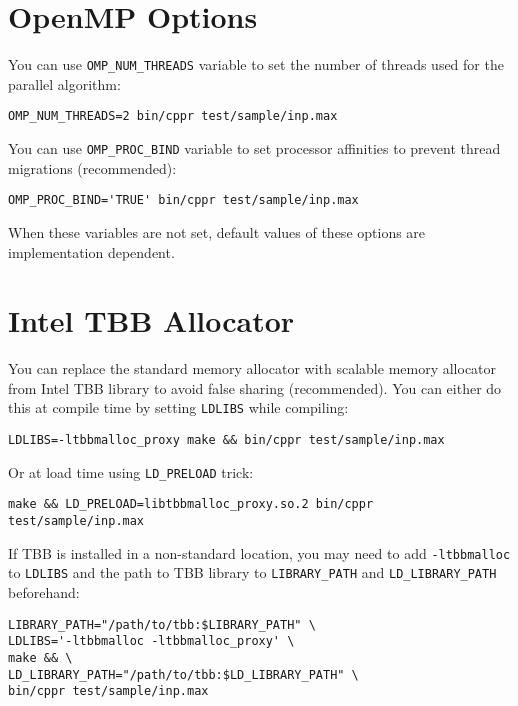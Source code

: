 \documentclass{article}
\begin{document}
\section{OpenMP Options}

You can use \texttt{OMP\_NUM\_THREADS} variable to set the number of threads used for
the parallel algorithm:

\begin{verbatim}
OMP_NUM_THREADS=2 bin/cppr test/sample/inp.max
\end{verbatim}

You can use \texttt{OMP\_PROC\_BIND} variable to set processor affinities to prevent
thread migrations (recommended):

\begin{verbatim}
OMP_PROC_BIND='TRUE' bin/cppr test/sample/inp.max
\end{verbatim}

When these variables are not set, default values of these options are
implementation dependent.

\section{Intel TBB Allocator}

You can replace the standard memory allocator with scalable memory allocator
from Intel TBB library to avoid false sharing (recommended). You can either
do this at compile time by setting \texttt{LDLIBS} while compiling:

\begin{verbatim}
LDLIBS=-ltbbmalloc_proxy make && bin/cppr test/sample/inp.max
\end{verbatim}

Or at load time using \texttt{LD\_PRELOAD} trick:

\begin{verbatim}
make && LD_PRELOAD=libtbbmalloc_proxy.so.2 bin/cppr test/sample/inp.max
\end{verbatim}

If TBB is installed in a non-standard location, you may need to add
\texttt{-ltbbmalloc} to \texttt{LDLIBS} and the path to TBB library to \texttt{LIBRARY\_PATH} and
\texttt{LD\_LIBRARY\_PATH} beforehand:

\begin{verbatim}
LIBRARY_PATH="/path/to/tbb:$LIBRARY_PATH" \
LDLIBS='-ltbbmalloc -ltbbmalloc_proxy' \
make && \
LD_LIBRARY_PATH="/path/to/tbb:$LD_LIBRARY_PATH" \
bin/cppr test/sample/inp.max
\end{verbatim}
\end{document}
